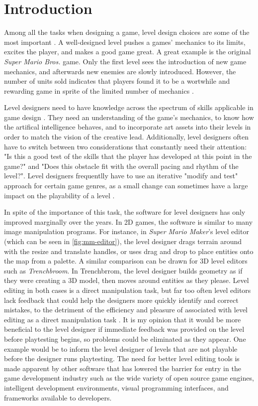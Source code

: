 \section{Introduction}

Among all the tasks when designing a game, level design choices are some of the
most important \cite{blezinski2000, smith2008}. A well-designed level pushes a games' mechanics to its limits,
excites the player, and makes a good game great. A great example is the original
\emph{Super Mario Bros.} game. Only the first level sees the introduction of new
game mechanics, and afterwards new enemies are slowly introduced. However, the
number of units sold indicates that players found it to be a wortwhile and
rewarding game in sprite of the limited number of mechanics \cite{shaker2011}.

Level designers need to have knowledge across the spectrum of skills applicable
in game design \cite{blezinski2000}. They need an understanding of the game's mechanics, to know how
the artifical intelligence behaves, and to incorporate art assets into their 
levels in order to match the vision of the creative lead. Additionally, level
designers often have to switch between two considerations that constantly need
their attention: "Is this a good test of the skills that the player has
developed at this point in the game?" and "Does this obstacle fit with the
overall pacing and rhythm of the level?". Level designers frequentlly have to
use an iterative "modify and test" approach for certain game genres, as a small
change can sometimes have a large impact on the playability of a level \cite{smith2010}.

In spite of the importance of this task, the software for level designers has only
improved marginally over the years. In 2D games, the software is similar to many image
manipulation programs. For instance, in \emph{Super Mario Maker}'s level editor (which
can be seen in \autoref{fig:mm-editor}), the level designer drags terrain around with the resize and
translate handles, or uses drag and drop to place entities onto the map from a palette.
A similar comparison can be drawn for 3D level editors such as \emph{Trenchbroom}. In
Trenchbrrom, the level designer builds geometry as if they were creating a 3D model, then
moves around entities as they please. Level editing in both cases is a direct manipulation
task, but far too often level editors lack feedback that could help the designers more
quickly identify and correct mistakes, to the detriment of the efficiency and pleasure of
associated with level editing as a direct manipulation task \cite{schneiderman1983}. It is my
opinion that it would be more beneficial to the level designer if immediate feedback was 
provided on the level before playtesting begins, so problems could be eliminated as they
appear. One example would be to inform the level designer of levels that are not playable
before the designer runs playtesting. The need for better level editing tools is made
apparent by other software that has lowered the barrier for entry in the game development
industry such as the wide variety of open source game engines, intelligent development
environments, visual programming interfaces, and frameworks available to developers.


